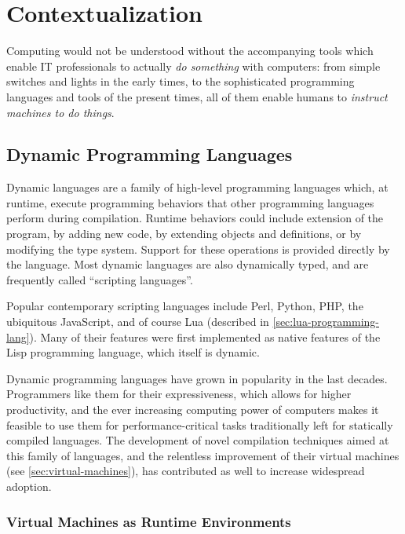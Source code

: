 
\chapter{Contextualization}

Computing would not be understood without the accompanying tools which enable
IT professionals to actually \emph{do something} with computers: from simple
switches and lights in the early times, to the sophisticated programming
languages and tools of the present times, all of them enable humans to
\emph{instruct machines to do things}.


\section{Dynamic Programming Languages}

Dynamic languages  are a family of
high-level programming languages which, at runtime, execute programming
behaviors that other programming languages perform during compilation. Runtime
behaviors could include extension of the program, by adding new code, by
extending objects and definitions, or by modifying the type system. Support
for these operations is provided directly by the language. Most dynamic
languages are also dynamically typed, and are frequently called “scripting
languages”.

Popular contemporary scripting languages include Perl, Python, PHP, the
ubiquitous JavaScript, and of course Lua (described in
\autoref{sec:lua-programming-lang}). Many of their features were first
implemented as native features of the Lisp programming language, which itself
is dynamic.

Dynamic programming languages have grown in popularity in the last decades.
Programmers like them for their expressiveness, which allows for higher
productivity, and the ever increasing computing power of computers makes it
feasible to use them for performance-critical tasks traditionally left for
statically compiled languages. The development of novel compilation techniques
aimed at this family of languages, and the relentless improvement of their
virtual machines (see \autoref{sec:virtual-machines}), has contributed as well
to increase widespread adoption.

\subsection{Virtual Machines as Runtime Environments}
  \label{sec:virtual-machines}

